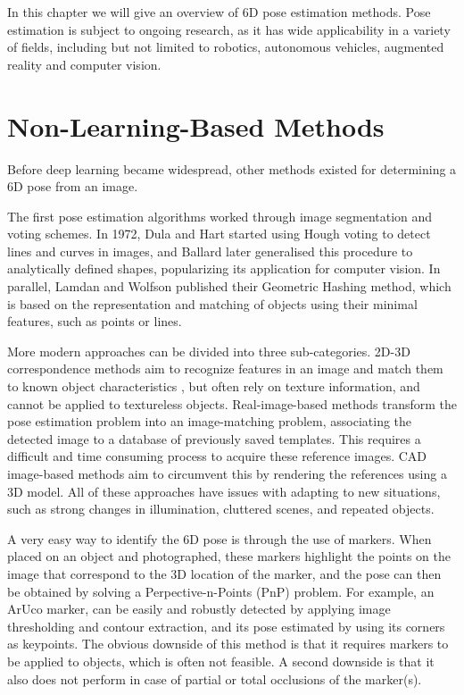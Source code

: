 \label{ch:state_of_the_art}

In this chapter we will give an overview of 6D pose estimation methods. Pose estimation is subject to ongoing research, as it has wide applicability in a variety of fields, including but not limited to robotics, autonomous vehicles, augmented reality and computer vision.

\section{Non-Learning-Based Methods}
\label{s:notlearningbasedmethods}

Before deep learning became widespread, other methods existed for determining a 6D pose from an image. 

The first pose estimation algorithms worked through image segmentation and voting schemes. In 1972, Dula and Hart started using Hough\cite{Hough} voting to detect lines and curves in images\cite{HoughLines}, and Ballard later generalised this procedure to analytically defined shapes\cite{generalisedHough}, popularizing its application for computer vision. In parallel, Lamdan and Wolfson published their Geometric Hashing\cite{GHashing} method, which is based on the representation and matching of objects using their minimal features, such as points or lines.

More modern approaches can be divided into three sub-categories. 2D-3D correspondence methods aim to recognize features in an image and match them to known object characteristics \cite{SURF}, but often rely on texture information, and cannot be applied to textureless objects. Real-image-based methods\cite{ImageMatching} transform the pose estimation problem into an image-matching problem, associating the detected image to a database of previously saved templates. This requires a difficult and time consuming process to acquire these reference images. CAD image-based methods\cite{CADMatching} aim to circumvent this by rendering the references using a 3D model. All of these approaches have issues with adapting to new situations, such as strong changes in illumination, cluttered scenes, and repeated objects.

A very easy way to identify the 6D pose is through the use of markers. When placed on an object and photographed, these markers highlight the points on the image that correspond to the 3D location of the marker, and the pose can then be obtained by solving a Perpective-n-Points\cite{PnP} (PnP) problem. For example, an ArUco marker\cite{Aruco}, can be easily and robustly detected by applying image thresholding and contour extraction, and its pose estimated by using its corners as keypoints\cite{ArucoDetection}. The obvious downside of this method is that it requires markers to be applied to objects, which is often not feasible. A second downside is that it also does not perform in case of partial or total occlusions of the marker(s).

